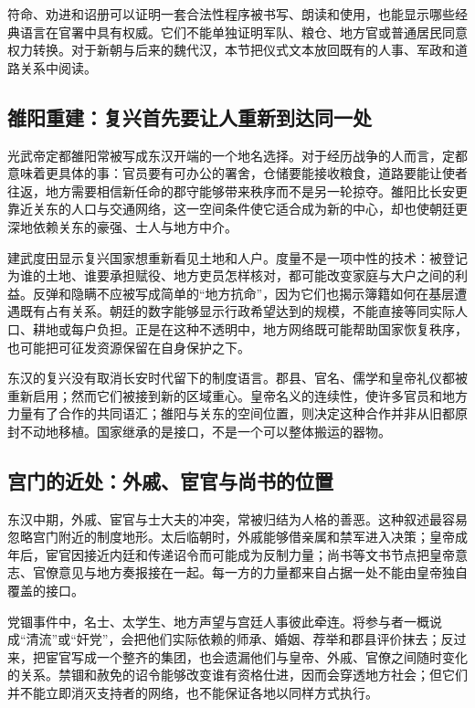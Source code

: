 \begin{debate}[受禅文本能证明什么]
符命、劝进和诏册可以证明一套合法性程序被书写、朗读和使用，也能显示哪些经典语言在官署中具有权威。它们不能单独证明军队、粮仓、地方官或普通居民同意权力转换。对于新朝与后来的魏代汉，本节把仪式文本放回既有的人事、军政和道路关系中阅读。
\end{debate}

\subsection{雒阳重建：复兴首先要让人重新到达同一处}

光武帝定都雒阳常被写成东汉开端的一个地名选择。对于经历战争的人而言，定都意味着更具体的事：官员要有可办公的署舍，仓储要能接收粮食，道路要能让使者往返，地方需要相信新任命的郡守能够带来秩序而不是另一轮掠夺。雒阳比长安更靠近关东的人口与交通网络，这一空间条件使它适合成为新的中心，却也使朝廷更深地依赖关东的豪强、士人与地方中介。

建武度田显示复兴国家想重新看见土地和人户。度量不是一项中性的技术：被登记为谁的土地、谁要承担赋役、地方吏员怎样核对，都可能改变家庭与大户之间的利益。反弹和隐瞒不应被写成简单的“地方抗命”，因为它们也揭示簿籍如何在基层遭遇既有占有关系。朝廷的数字能够显示行政希望达到的规模，不能直接等同实际人口、耕地或每户负担。正是在这种不透明中，地方网络既可能帮助国家恢复秩序，也可能把可征发资源保留在自身保护之下。

东汉的复兴没有取消长安时代留下的制度语言。郡县、官名、儒学和皇帝礼仪都被重新启用；然而它们被接到新的区域重心。皇帝名义的连续性，使许多官员和地方力量有了合作的共同语汇；雒阳与关东的空间位置，则决定这种合作并非从旧都原封不动地移植。国家继承的是接口，不是一个可以整体搬运的器物。

\subsection{宫门的近处：外戚、宦官与尚书的位置}

东汉中期，外戚、宦官与士大夫的冲突，常被归结为人格的善恶。这种叙述最容易忽略宫门附近的制度地形。太后临朝时，外戚能够借亲属和禁军进入决策；皇帝成年后，宦官因接近内廷和传递诏令而可能成为反制力量；尚书等文书节点把皇帝意志、官僚意见与地方奏报接在一起。每一方的力量都来自占据一处不能由皇帝独自覆盖的接口。

党锢事件中，名士、太学生、地方声望与宫廷人事彼此牵连。将参与者一概说成“清流”或“奸党”，会把他们实际依赖的师承、婚姻、荐举和郡县评价抹去；反过来，把宦官写成一个整齐的集团，也会遗漏他们与皇帝、外戚、官僚之间随时变化的关系。禁锢和赦免的诏令能够改变谁有资格仕进，因而会穿透地方社会；但它们并不能立即消灭支持者的网络，也不能保证各地以同样方式执行。

